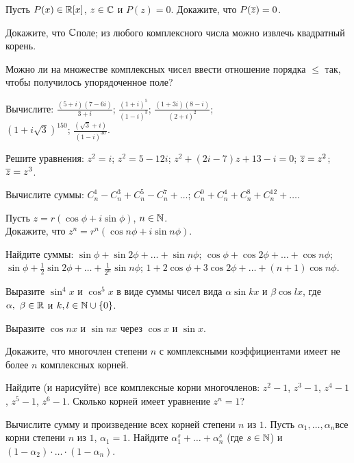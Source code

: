 \documentclass[a4paper,12pt]{article}
\begin{document}
Пусть $P(x)\in\mathbb{R}[x]$, $z\in\mathbb{C}$ и $P(z)=0$. Докажите, что $P(\overline z)=0$.

Докажите, что
$\mathbb{C}$\т поле;
из любого комплексного числа можно извлечь квадратный корень.

Можно ли на множестве комплексных чисел ввести отношение порядка $\le$ так, чтобы получилось упорядоченное поле?

Вычислите:
$\frac{(5+i)(7-6i)}{3+i}$;
$\frac{(1+i)^5}{(1-i)^3}$;
$\frac{(1+3i)(8-i)}{(2+i)^2}$;\\
$(1+i\sqrt{3})^{150}$;
$\frac{(\sqrt{3}+i)}{(1-i)^{30}}$.

Решите уравнения:
$z^2=i$;
$z^2=5-12i$;
$z^2+(2i-7)z+13-i=0$;
$\overline z=z^2$;
$\overline z=z^3$.

Вычислите суммы:
$C_{n}^{1}-C_{n}^{3}+C_{n}^{5}-C_{n}^{7}+\dots$;
$C_{n}^{0}+C_{n}^{4}+C_{n}^{8}+C_{n}^{12}+\dots$.

Пусть $z=r(\cos\phi+i\sin\phi)$, $n\in\mathbb{N}$. \\
Докажите, что $z^n=r^n(\cos n\phi+i\sin n\phi)$.

Найдите суммы:
 $\sin \phi +\sin 2\phi +\ldots +\sin n\phi$;
 $\cos \phi +\cos 2\phi +\ldots +\cos n\phi$;\\
 $\sin \phi +\frac{1}{2}\sin 2\phi +\ldots +\frac{1}{2^n}\sin n\phi$;
 $1+2\cos \phi +3\cos 2\phi +\ldots +(n+1)\cos n\phi$.

Выразите $\sin^4x$ и $\cos^5x$ в виде суммы чисел вида $\alpha\sin{kx}$ и $\beta\cos{lx}$, где $\alpha,\ \beta\in\mathbb{R}$ и $k,l\in\mathbb{N}\cup\{0\}$.

Выразите $\cos nx$ и $\sin nx$ через $\cos{x}$ и $\sin{x}$.

\newpage

Докажите, что многочлен степени $n$ с комплексными коэффициентами имеет не более $n$ комплексных корней.


Найдите (и нарисуйте) все комплексные корни многочленов: $z^2-1$, $z^3-1$, $z^4-1$,
$z^5-1$, $z^6-1$.
Сколько корней имеет уравнение $z^n=1$?

Вычислите сумму и произведение всех корней степени $n$ из $1$.
Пусть $\alpha_1, \ldots, \alpha_n$\т все корни степени $n$ из $1$, $\alpha_1=1$. Найдите $\alpha_1^s+\ldots+\alpha_n^s$ (где $s\in\mathbb{N}$) и $(1-\alpha_2)\cdot\ldots\cdot(1-\alpha_n)$.
\end{document}
